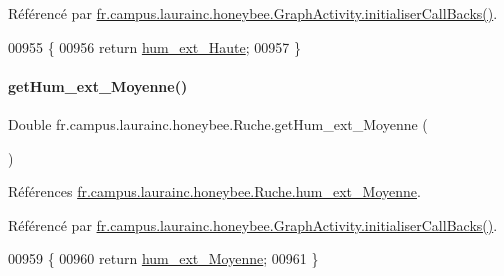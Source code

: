Référencé par \hyperlink{classfr_1_1campus_1_1laurainc_1_1honeybee_1_1_graph_activity_a8dc56c3e0744bcb9295ad10e726b5fdb}{fr.\+campus.\+laurainc.\+honeybee.\+Graph\+Activity.\+initialiser\+Call\+Backs()}.


\begin{DoxyCode}
00955                                      \{
00956         \textcolor{keywordflow}{return} \hyperlink{classfr_1_1campus_1_1laurainc_1_1honeybee_1_1_ruche_a4704dea77345a189a860088023a56726}{hum\_ext\_Haute};
00957     \}
\end{DoxyCode}
\mbox{\label{classfr_1_1campus_1_1laurainc_1_1honeybee_1_1_ruche_a354b16d6aa62f6b8b147be86fc3ca772}} 
\paragraph{\texorpdfstring{get\+Hum\+\_\+ext\+\_\+\+Moyenne()}{getHum\_ext\_Moyenne()}}
{\footnotesize\ttfamily Double fr.\+campus.\+laurainc.\+honeybee.\+Ruche.\+get\+Hum\+\_\+ext\+\_\+\+Moyenne (\begin{DoxyParamCaption}{ }\end{DoxyParamCaption})}



Références \hyperlink{classfr_1_1campus_1_1laurainc_1_1honeybee_1_1_ruche_ad1f2d0608c7cbb7689254ef4ee70942a}{fr.\+campus.\+laurainc.\+honeybee.\+Ruche.\+hum\+\_\+ext\+\_\+\+Moyenne}.



Référencé par \hyperlink{classfr_1_1campus_1_1laurainc_1_1honeybee_1_1_graph_activity_a8dc56c3e0744bcb9295ad10e726b5fdb}{fr.\+campus.\+laurainc.\+honeybee.\+Graph\+Activity.\+initialiser\+Call\+Backs()}.


\begin{DoxyCode}
00959                                        \{
00960         \textcolor{keywordflow}{return} \hyperlink{classfr_1_1campus_1_1laurainc_1_1honeybee_1_1_ruche_ad1f2d0608c7cbb7689254ef4ee70942a}{hum\_ext\_Moyenne};
00961     \}
\end{DoxyCode}
\mbox{\label{classfr_1_1campus_1_1laurainc_1_1honeybee_1_1_ruche_a57efc0899720f55778f4ed42157e4eb3}} 
